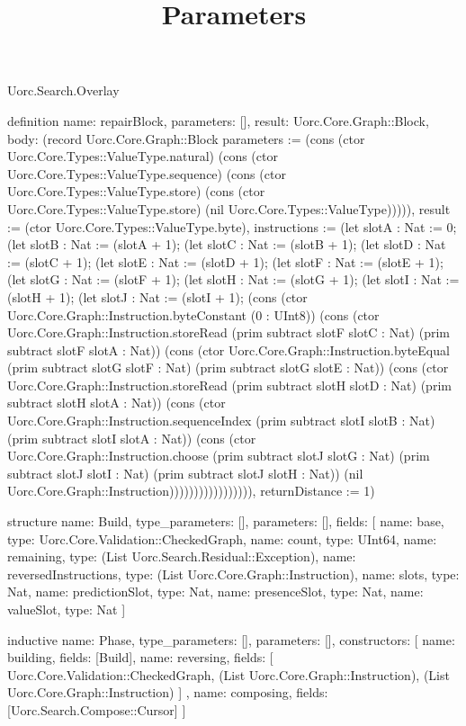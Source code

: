 \begin{lexlean}{Uorc.Search.Overlay}
\title{Parameters}
\begin{semanticmodule}
definition{
  name: repairBlock,
  parameters: [],
  result: Uorc.Core.Graph::Block,
  body: (record Uorc.Core.Graph::Block {parameters := (cons (ctor Uorc.Core.Types::ValueType.natural) (cons (ctor Uorc.Core.Types::ValueType.sequence) (cons (ctor Uorc.Core.Types::ValueType.store) (cons (ctor Uorc.Core.Types::ValueType.store) (nil Uorc.Core.Types::ValueType))))), result := (ctor Uorc.Core.Types::ValueType.byte), instructions := (let slotA : Nat := 0; (let slotB : Nat := (slotA + 1); (let slotC : Nat := (slotB + 1); (let slotD : Nat := (slotC + 1); (let slotE : Nat := (slotD + 1); (let slotF : Nat := (slotE + 1); (let slotG : Nat := (slotF + 1); (let slotH : Nat := (slotG + 1); (let slotI : Nat := (slotH + 1); (let slotJ : Nat := (slotI + 1); (cons (ctor Uorc.Core.Graph::Instruction.byteConstant (0 : UInt8)) (cons (ctor Uorc.Core.Graph::Instruction.storeRead (prim subtract slotF slotC : Nat) (prim subtract slotF slotA : Nat)) (cons (ctor Uorc.Core.Graph::Instruction.byteEqual (prim subtract slotG slotF : Nat) (prim subtract slotG slotE : Nat)) (cons (ctor Uorc.Core.Graph::Instruction.storeRead (prim subtract slotH slotD : Nat) (prim subtract slotH slotA : Nat)) (cons (ctor Uorc.Core.Graph::Instruction.sequenceIndex (prim subtract slotI slotB : Nat) (prim subtract slotI slotA : Nat)) (cons (ctor Uorc.Core.Graph::Instruction.choose (prim subtract slotJ slotG : Nat) (prim subtract slotJ slotI : Nat) (prim subtract slotJ slotH : Nat)) (nil Uorc.Core.Graph::Instruction))))))))))))))))), returnDistance := 1})
}

structure{
  name: Build,
  type_parameters: [],
  parameters: [],
  fields: [
    {name: base, type: Uorc.Core.Validation::CheckedGraph},
    {name: count, type: UInt64},
    {name: remaining, type: (List Uorc.Search.Residual::Exception)},
    {name: reversedInstructions, type: (List Uorc.Core.Graph::Instruction)},
    {name: slots, type: Nat},
    {name: predictionSlot, type: Nat},
    {name: presenceSlot, type: Nat},
    {name: valueSlot, type: Nat}
  ]
}

inductive{
  name: Phase,
  type_parameters: [],
  parameters: [],
  constructors: [
    {name: building, fields: [Build]},
    {
      name: reversing,
      fields: [
        Uorc.Core.Validation::CheckedGraph,
        (List Uorc.Core.Graph::Instruction),
        (List Uorc.Core.Graph::Instruction)
      ]
    },
    {name: composing, fields: [Uorc.Search.Compose::Cursor]}
  ]
}


\end{semanticmodule}
\end{lexlean}
